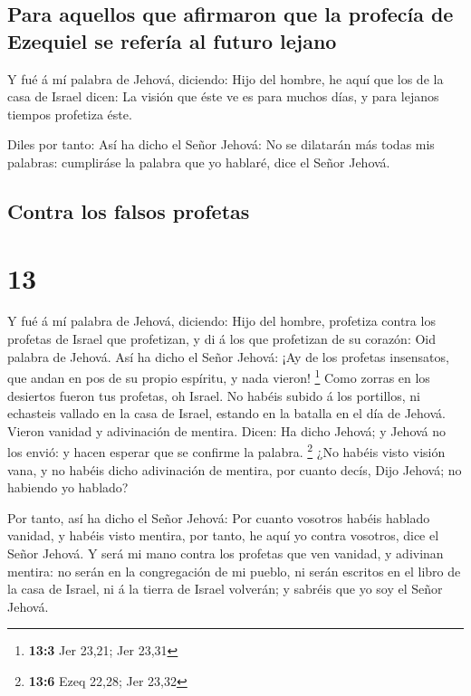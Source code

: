 \hypertarget{para-aquellos-que-afirmaron-que-la-profecuxeda-de-ezequiel-se-referuxeda-al-futuro-lejano}{%
\subsection{Para aquellos que afirmaron que la profecía de Ezequiel se
refería al futuro
lejano}\label{para-aquellos-que-afirmaron-que-la-profecuxeda-de-ezequiel-se-referuxeda-al-futuro-lejano}}

 Y fué á mí palabra de Jehová, diciendo: 
Hijo del hombre, he aquí que los de la casa de Israel dicen: La visión
que éste ve es para muchos días, y para lejanos tiempos profetiza éste.

 Diles por tanto: Así ha dicho el Señor Jehová: No se
dilatarán más todas mis palabras: cumpliráse la palabra que yo hablaré,
dice el Señor Jehová.

\hypertarget{contra-los-falsos-profetas}{%
\subsection{Contra los falsos
profetas}\label{contra-los-falsos-profetas}}

\hypertarget{section-12}{%
\section{13}\label{section-12}}

 Y fué á mí palabra de Jehová, diciendo: 
Hijo del hombre, profetiza contra los profetas de Israel que profetizan,
y di á los que profetizan de su corazón: Oid palabra de Jehová.
 Así ha dicho el Señor Jehová: ¡Ay de los profetas
insensatos, que andan en pos de su propio espíritu, y nada vieron!
\footnote{\textbf{13:3} Jer 23,21; Jer 23,31}  Como zorras
en los desiertos fueron tus profetas, oh Israel.  No
habéis subido á los portillos, ni echasteis vallado en la casa de
Israel, estando en la batalla en el día de Jehová.  Vieron
vanidad y adivinación de mentira. Dicen: Ha dicho Jehová; y Jehová no
los envió: y hacen esperar que se confirme la palabra. \footnote{\textbf{13:6}
  Ezeq 22,28; Jer 23,32}  ¿No habéis visto visión vana, y
no habéis dicho adivinación de mentira, por cuanto decís, Dijo Jehová;
no habiendo yo hablado?

 Por tanto, así ha dicho el Señor Jehová: Por cuanto
vosotros habéis hablado vanidad, y habéis visto mentira, por tanto, he
aquí yo contra vosotros, dice el Señor Jehová.  Y será mi
mano contra los profetas que ven vanidad, y adivinan mentira: no serán
en la congregación de mi pueblo, ni serán escritos en el libro de la
casa de Israel, ni á la tierra de Israel volverán; y sabréis que yo soy
el Señor Jehová.

